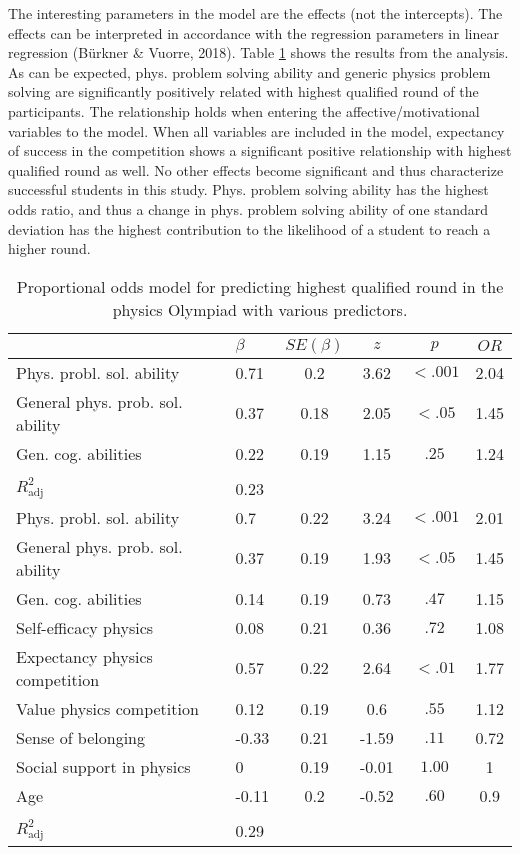 \documentclass[D:/studies/WinnerS/Erhebungen/IPhO1718/paper/probsol_paper/main/TaylorFrancis/interactapasample]{subfiles}
\begin{document}
The interesting parameters in the model are the effects (not the intercepts). The effects can be interpreted in accordance with the regression parameters in linear regression (B\"u{}rkner \& Vuorre, 2018). Table \ref{propOddModel} shows the results from the analysis. As can be expected, phys. problem solving ability and generic physics problem solving are significantly positively related with highest qualified round of the participants. The relationship holds when entering the affective/motivational variables to the model. When all variables are included in the model, expectancy of success in the competition shows a significant positive relationship with highest qualified round as well. No other effects become significant and thus characterize successful students in this study. Phys. problem solving ability has the highest odds ratio, and thus a change in phys. problem solving ability of one standard deviation has the highest contribution to the likelihood of a student to reach a higher round.


\begin{table}
\centering
\caption{Proportional odds model for predicting highest qualified round in the physics Olympiad with various predictors.}
\label{propOddModel}
\begin{tabular}{llcccc}
  \toprule
 & $\beta$ & $SE(\beta)$ & $z$ & $p$ & $OR$ \\ 
  \midrule
Phys. probl. sol. ability  & 0.71 & 0.2 & 3.62 & $<.001$ & 2.04 \\ 
  General phys. prob. sol. ability  & 0.37 & 0.18 & 2.05 & $<.05$ & 1.45 \\ 
  Gen. cog. abilities  & 0.22 & 0.19 & 1.15 & $.25$ & 1.24 \\ 
   &  &  &  &  &  \\ 
  $R^2_{\text{adj}}$ & 0.23 &  &  &  &  \\ 
  \midrule Phys. probl. sol. ability & 0.7 & 0.22 & 3.24 & $<.001$ & 2.01 \\ 
  General phys. prob. sol. ability & 0.37 & 0.19 & 1.93 & $<.05$ & 1.45 \\ 
  Gen. cog. abilities & 0.14 & 0.19 & 0.73 & $.47$ & 1.15 \\ 
  Self-efficacy physics & 0.08 & 0.21 & 0.36 & $.72$ & 1.08 \\ 
  Expectancy physics competition & 0.57 & 0.22 & 2.64 & $<.01$ & 1.77 \\ 
  Value physics competition & 0.12 & 0.19 & 0.6 & $.55$ & 1.12 \\ 
  Sense of belonging & -0.33 & 0.21 & -1.59 & $.11$ & 0.72 \\ 
  Social support in physics & 0 & 0.19 & -0.01 & $1.00$ & 1 \\ 
  Age & -0.11 & 0.2 & -0.52 & $.60$ & 0.9 \\ 
    &  &  &  &  &  \\ 
  $R^2_{\text{adj}}$  & 0.29 &  &  &  &  \\ 
   \bottomrule
\end{tabular}\end{table}
\end{document}
